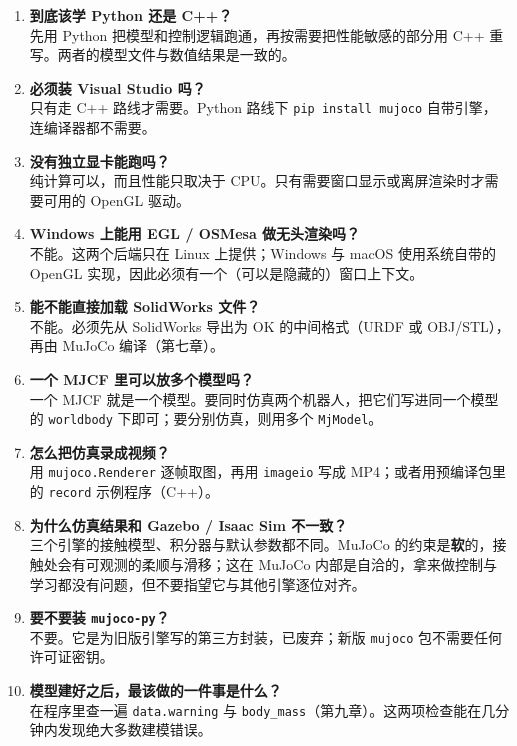 \begin{enumerate}
	\item \textbf{到底该学 Python 还是 C++？}\\
	      先用 Python 把模型和控制逻辑跑通，再按需要把性能敏感的部分用 C++ 重写。两者的模型文件与数值结果是一致的。

	\item \textbf{必须装 Visual Studio 吗？}\\
	      只有走 C++ 路线才需要。Python 路线下 \texttt{pip install mujoco} 自带引擎，连编译器都不需要。

	\item \textbf{没有独立显卡能跑吗？}\\
	      纯计算可以，而且性能只取决于 CPU。只有需要窗口显示或离屏渲染时才需要可用的 OpenGL 驱动。

	\item \textbf{Windows 上能用 EGL / OSMesa 做无头渲染吗？}\\
	      不能。这两个后端只在 Linux 上提供；Windows 与 macOS 使用系统自带的 OpenGL 实现，因此必须有一个（可以是隐藏的）窗口上下文。

	\item \textbf{能不能直接加载 SolidWorks 文件？}\\
	      不能。必须先从 SolidWorks 导出为 OK 的中间格式（URDF 或 OBJ/STL），再由 MuJoCo 编译（第七章）。

	\item \textbf{一个 MJCF 里可以放多个模型吗？}\\
	      一个 MJCF 就是一个模型。要同时仿真两个机器人，把它们写进同一个模型的 \texttt{worldbody} 下即可；要分别仿真，则用多个 \texttt{MjModel}。

	\item \textbf{怎么把仿真录成视频？}\\
	      用 \texttt{mujoco.Renderer} 逐帧取图，再用 \texttt{imageio} 写成 MP4；或者用预编译包里的 \texttt{record} 示例程序（C++）。

	\item \textbf{为什么仿真结果和 Gazebo / Isaac Sim 不一致？}\\
	      三个引擎的接触模型、积分器与默认参数都不同。MuJoCo 的约束是\textbf{软}的，接触处会有可观测的柔顺与滑移；这在 MuJoCo 内部是自洽的，拿来做控制与学习都没有问题，但不要指望它与其他引擎逐位对齐。

	\item \textbf{要不要装 \texttt{mujoco-py}？}\\
	      不要。它是为旧版引擎写的第三方封装，已废弃；新版 \texttt{mujoco} 包不需要任何许可证密钥。

	\item \textbf{模型建好之后，最该做的一件事是什么？}\\
	      在程序里查一遍 \texttt{data.warning} 与 \texttt{body\_mass}（第九章）。这两项检查能在几分钟内发现绝大多数建模错误。
\end{enumerate}
